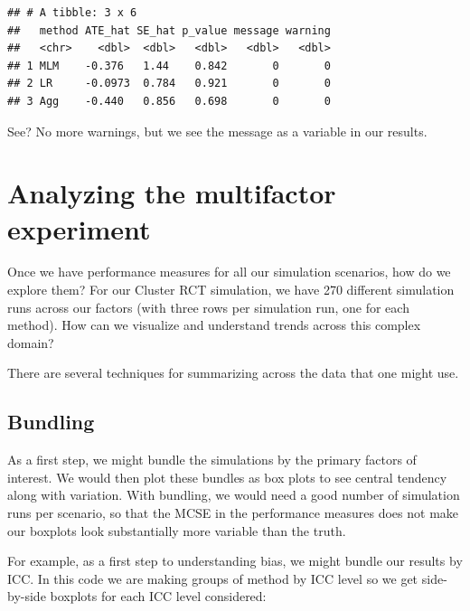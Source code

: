 \documentclass[
]{book}
\begin{document}
\begin{verbatim}
## # A tibble: 3 x 6
##   method ATE_hat SE_hat p_value message warning
##   <chr>    <dbl>  <dbl>   <dbl>   <dbl>   <dbl>
## 1 MLM    -0.376   1.44    0.842       0       0
## 2 LR     -0.0973  0.784   0.921       0       0
## 3 Agg    -0.440   0.856   0.698       0       0
\end{verbatim}

See? No more warnings, but we see the message as a variable in our results.

\chapter{Analyzing the multifactor experiment}\label{analyzing-the-multifactor-experiment}

Once we have performance measures for all our simulation scenarios, how do we explore them?
For our Cluster RCT simulation, we have 270 different simulation runs across our factors (with three rows per simulation run, one for each method).
How can we visualize and understand trends across this complex domain?

There are several techniques for summarizing across the data that one might use.

\section{Bundling}\label{bundling}

As a first step, we might bundle the simulations by the primary factors of interest.
We would then plot these bundles as box plots to see central tendency along with variation.
With bundling, we would need a good number of simulation runs per scenario, so that the MCSE in the performance measures does not make our boxplots look substantially more variable than the truth.

For example, as a first step to understanding bias, we might bundle our results by ICC.
In this code we are making groups of method by ICC level so we get side-by-side boxplots for each ICC level considered:
\end{document}
